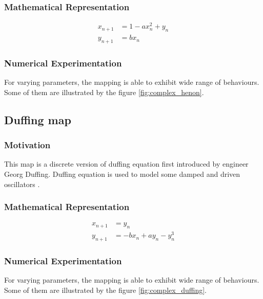 \subsubsection{Mathematical Representation}
\begin{equation}
\begin{split}
    x_{n+1} &=  1 - a x_{n}^2 + y_{n} \\
    y_{n+1} &=  b x_{n}
\end{split}
\end{equation}

\subsubsection{Numerical Experimentation}
For varying parameters, the mapping is able to exhibit wide range of behaviours.
Some of them are illustrated by the figure \ref{fig:complex_henon}.

\subsection{Duffing map}

\subsubsection{Motivation}

This map is a discrete version of duffing equation first introduced by engineer Georg Duffing.
Duffing equation is used to model some damped and driven oscillators \cite{Urrea2022}.


\subsubsection{Mathematical Representation}
\begin{equation}
\begin{split}
    x_{n+1} &=  y_{n} \\
    y_{n+1} &=  -b x_{n} + a y_{n} - y_{n}^3
\end{split}
\end{equation}

\subsubsection{Numerical Experimentation}
For varying parameters, the mapping is able to exhibit wide range of behaviours.
Some of them are illustrated by the figure \ref{fig:complex_duffing}.

\endinput